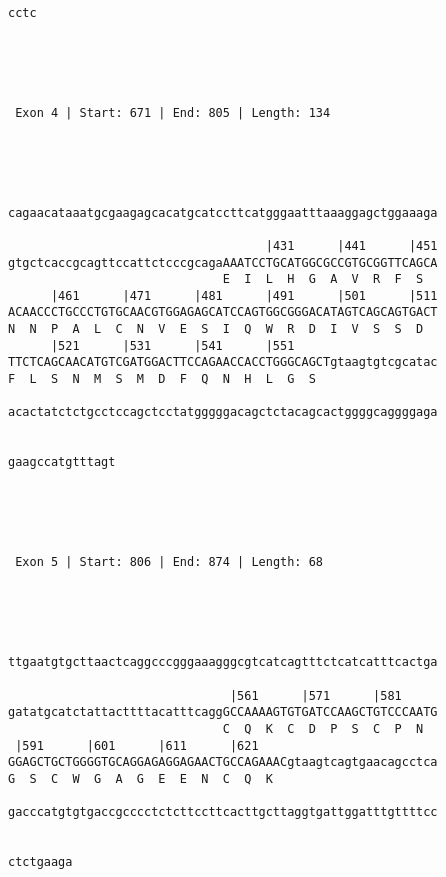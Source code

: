 \documentclass{article}
\begin{document}
\begin{Verbatim}
    
cctc
    




 Exon 4 | Start: 671 | End: 805 | Length: 134 




                                                            
cagaacataaatgcgaagagcacatgcatccttcatgggaatttaaaggagctggaaaga
                                                            
                                    |431      |441      |451
gtgctcaccgcagttccattctcccgcagaAAATCCTGCATGGCGCCGTGCGGTTCAGCA
                              E  I  L  H  G  A  V  R  F  S  
      |461      |471      |481      |491      |501      |511
ACAACCCTGCCCTGTGCAACGTGGAGAGCATCCAGTGGCGGGACATAGTCAGCAGTGACT
N  N  P  A  L  C  N  V  E  S  I  Q  W  R  D  I  V  S  S  D  
      |521      |531      |541      |551                    
TTCTCAGCAACATGTCGATGGACTTCCAGAACCACCTGGGCAGCTgtaagtgtcgcatac
F  L  S  N  M  S  M  D  F  Q  N  H  L  G  S                 
                                                            
acactatctctgcctccagctcctatgggggacagctctacagcactggggcaggggaga
                                                            
               
gaagccatgtttagt
               




 Exon 5 | Start: 806 | End: 874 | Length: 68 




                                                            
ttgaatgtgcttaactcaggcccgggaaagggcgtcatcagtttctcatcatttcactga
                                                            
                               |561      |571      |581     
gatatgcatctattacttttacatttcaggGCCAAAAGTGTGATCCAAGCTGTCCCAATG
                              C  Q  K  C  D  P  S  C  P  N  
 |591      |601      |611      |621                         
GGAGCTGCTGGGGTGCAGGAGAGGAGAACTGCCAGAAACgtaagtcagtgaacagcctca
G  S  C  W  G  A  G  E  E  N  C  Q  K                       
                                                            
gacccatgtgtgaccgcccctctcttccttcacttgcttaggtgattggatttgttttcc
                                                            
         
ctctgaaga
         





\end{Verbatim}
\end{document}
